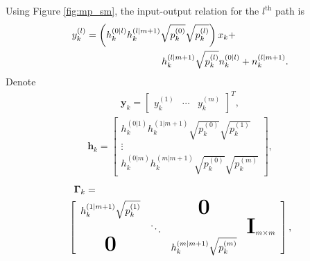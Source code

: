 \documentclass[journal]{IEEEtran}
\begin{document}
Using Figure \ref{fig:mp_sm}, the input-output relation for the $l^{\mbox{th}}$ path is
\begin{eqnarray}
y_k^{(l)} = \left( h_k^{(0|l)} h_k^{(l|m+1)} \sqrt{p_k^{(0)}} \sqrt{p_k^{(l)}} \right) x_k
+ \hspace{.75in} \nonumber \\
\hspace{.75in} h_k^{(l|m+1)} \sqrt{p_k^{(l)}}  n_k^{(0|l)} +
n_k^{(l|m+1)}. \label{eqn:mp_af_inout}
\end{eqnarray}
Denote
\begin{eqnarray}
\mathbf{y}_k = \left[
\begin{array}{ccc}
y_k^{(1)} & \cdots & y_k^{(m)}
\end{array} \right]^T,
\end{eqnarray}
\begin{eqnarray}
\mathbf{h}_k = \left[ \begin{array}{c} h_k^{(0|1)}h_k^{(1|m+1)}
\sqrt{p_k^{(0)}}
\sqrt{p_k^{(1)}} \\ \vdots  \\
h_k^{(0|m)}h_k^{(m|m+1)} \sqrt{p_k^{(0)}} \sqrt{p_k^{(m)}}
\end{array} \right], \label{eqn:mp_af_hk}
\end{eqnarray}
\begin{eqnarray}
\mathbf{\Gamma}_k = \hspace{2.8in} \nonumber \\
\left[
\begin{array}{ccccccc}
h_k^{(1|m+1)} \sqrt{p_k^{(1)}}&  & \textbf{\mbox{\huge{0}}} &   \\
 & \ddots & &  \textbf{\mbox{\huge{I}}}_{m \times m}    \\
\textbf{\mbox{\huge{0}}} &  &h_k^{(m|m+1)} \sqrt{p_k^{(m)}} &
\end{array}
\right] \mbox{,} \label{eqn:mp_af_Gammak}
\end{eqnarray}
\end{document}
